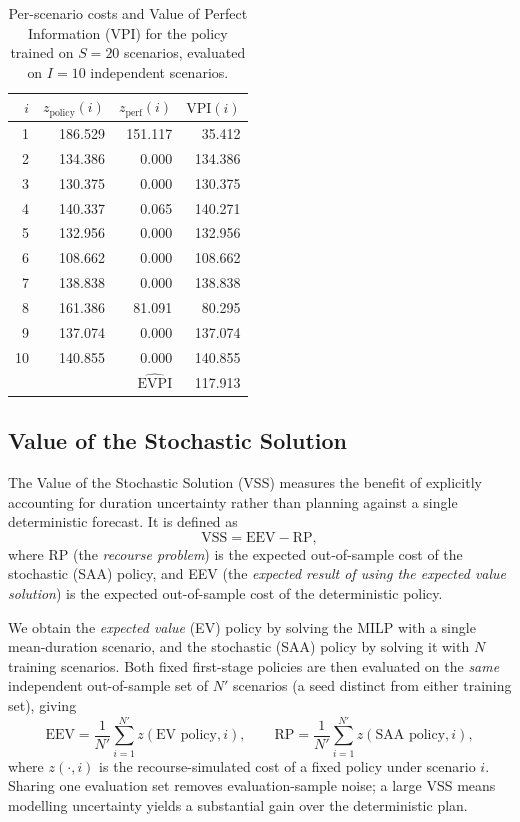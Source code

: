 \begin{table}[h]
    \centering
    \caption{Per-scenario costs and Value of Perfect Information (VPI) for the
    policy trained on $S = 20$ scenarios, evaluated on $I = 10$ independent
    scenarios.}
    \label{tab:vpi}
    \begin{tabular}{rrrr}
        \toprule
        $i$ & $z_{\text{policy}}(i)$ & $z_{\text{perf}}(i)$ & $\text{VPI}(i)$ \\
        \midrule
         1 & 186.529 & 151.117 &  35.412 \\
         2 & 134.386 &   0.000 & 134.386 \\
         3 & 130.375 &   0.000 & 130.375 \\
         4 & 140.337 &   0.065 & 140.271 \\
         5 & 132.956 &   0.000 & 132.956 \\
         6 & 108.662 &   0.000 & 108.662 \\
         7 & 138.838 &   0.000 & 138.838 \\
         8 & 161.386 &  81.091 &  80.295 \\
         9 & 137.074 &   0.000 & 137.074 \\
        10 & 140.855 &   0.000 & 140.855 \\
        \midrule
        \multicolumn{3}{r}{$\widehat{\text{EVPI}}$} & 117.913 \\
        \bottomrule
    \end{tabular}
\end{table}

\subsection{Value of the Stochastic Solution}
\label{subsec:VSS}

The Value of the Stochastic Solution (VSS) measures the benefit of explicitly
accounting for duration uncertainty rather than planning against a single
deterministic forecast. It is defined as
\[
    \text{VSS} = \text{EEV} - \text{RP},
\]
where RP (the \emph{recourse problem}) is the expected out-of-sample cost of the
stochastic (SAA) policy, and EEV (the \emph{expected result of using the
expected value solution}) is the expected out-of-sample cost of the
deterministic policy.

We obtain the \emph{expected value} (EV) policy by solving the MILP with a single
mean-duration scenario, and the stochastic (SAA) policy by solving it with $N$
training scenarios. Both fixed first-stage policies are then evaluated on the
\emph{same} independent out-of-sample set of $N'$ scenarios (a seed distinct from
either training set), giving
\[
    \text{EEV} = \frac{1}{N'} \sum_{i=1}^{N'} z\!\left(\text{EV policy}, i\right),
    \qquad
    \text{RP} = \frac{1}{N'} \sum_{i=1}^{N'} z\!\left(\text{SAA policy}, i\right),
\]
where $z(\cdot, i)$ is the recourse-simulated cost of a fixed policy under
scenario $i$. Sharing one evaluation set removes evaluation-sample noise; a large VSS means
modelling uncertainty yields a substantial gain over the deterministic plan.

